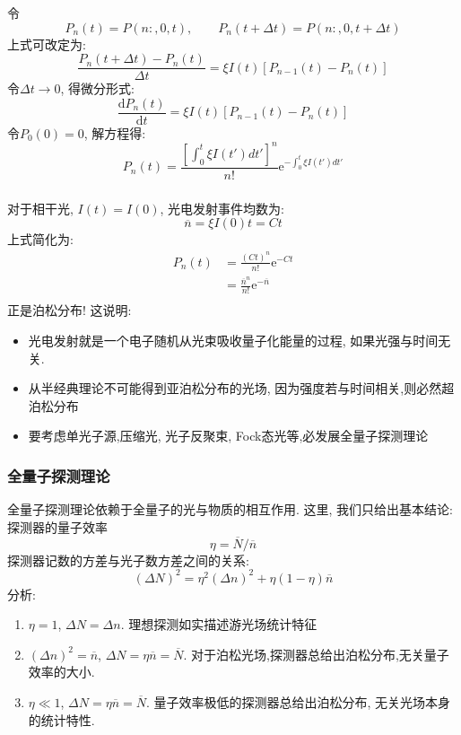 \begin{frame} 
 \frametitle{}
 令 \[ P_n (t)= P (n:, 0, t), \qquad P_n (t+\Delta t)=P (n:, 0, t+\Delta t)\]
 上式可改定为:
 \[ \frac{P_n (t+\Delta t)- P_n (t)}{\Delta t } =\xi I(t) [P_{n-1} (t) -P_{n} (t) ]  \]  
 令$ \Delta t \to 0$, 得微分形式:
 \[ \frac{\mathrm{d}P_n (t)}{\mathrm{d}t} =\xi I(t) [P_{n-1} (t) -P_{n} (t) ]  \]
 令$P_0 (0)=0$, 解方程得:
\[ P_n (t) = \frac{\left[ \int_0 ^t \xi I(t') d t' \right]^n }{n!} \mathrm{e}^{- \int_0 ^t \xi I(t') d t'  } \]
\end{frame}

\begin{frame} 
 \frametitle{}
    对于相干光, $I(t)=I(0)$, 光电发射事件均数为:
    \[ \overline{n} = \xi I(0) t = Ct\]
    上式简化为:
    \[ \begin{aligned}
        P_n (t) &= \frac{(Ct)^n }{n!} \mathrm{e}^{- Ct }\\
        &= \frac{\overline{n}^n }{n!} \mathrm{e}^{- \overline{n} }\\
    \end{aligned}\] 
    正是泊松分布! 这说明: \\ \vspace*{0.3em}
    \begin{itemize}
        \item 光电发射就是一个电子随机从光束吸收量子化能量的过程, 如果光强与时间无关. 
        \item 从半经典理论不可能得到亚泊松分布的光场, 因为强度若与时间相关,则必然超泊松分布
        \item 要考虑单光子源,压缩光, 光子反聚束, Fock态光等,必发展全量子探测理论 
    \end{itemize}
\end{frame}

\begin{frame} 
 \frametitle{全量子探测理论}
 全量子探测理论依赖于全量子的光与物质的相互作用. 这里, 我们只给出基本结论: 探测器的量子效率
 \[ \eta = \overline{N} /\overline{n} \]
 探测器记数的方差与光子数方差之间的关系:
 \[ (\Delta N )^2 = \eta^2 (\Delta n )^2 + \eta(1-\eta)\overline{n}  \]
 分析: 
    \begin{enumerate}     
    \item $\eta=1$, $\Delta N= \Delta n$. 理想探测如实描述游光场统计特征
     \item $(\Delta n )^2=\overline{n}$, $\Delta N= \eta \overline{n}= \overline{N} $. 对于泊松光场,探测器总给出泊松分布,无关量子效率的大小.
     \item $\eta \ll 1$, $\Delta N= \eta \overline{n}= \overline{N}$. 量子效率极低的探测器总给出泊松分布, 无关光场本身的统计特性.
    \end{enumerate}
\end{frame}

